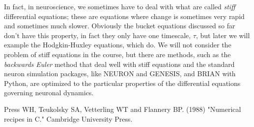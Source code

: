 \documentclass[11pt,a4paper]{scrartcl}
\begin{document}
In fact, in neuroscience, we sometimes have to deal with what are
called \textsl{stiff} differential equations; these are equations
where change is sometimes very rapid and sometimes much
slower. Obviously the bucket equations discussed so far don't have
this property, in fact they only have one timescale, $\tau$, but later
we will example the Hodgkin-Huxley equations, which do. We will not
consider the problem of stiff equations in the course, but there are
methods, such as the \textsl{backwards Euler} method that deal well
with stiff equations and the standard neuron simulation packages, like
NEURON and GENESIS, and BRIAN with Python, are optimized to the
particular properties of the differential equations governing neuronal
dynamics.

\begin{thebibliography}{10}

Press WH, Teukolsky SA, Vetterling WT and Flannery BP. (1988) "Numerical recipes in C." Cambridge University Press.

\end{thebibliography}
\end{document}

